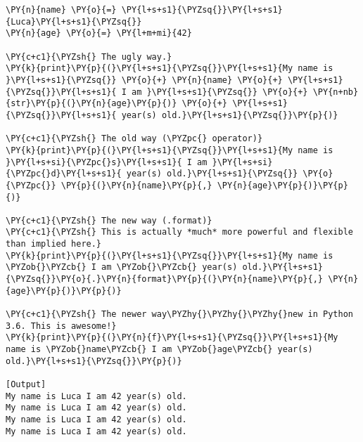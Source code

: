 \begin{Verbatim}[label=\makebox{\url{https://bitbucket.org/lbaldini/programming/src/tip/snippets/string\_formatting.py}},commandchars=\\\{\}]
\PY{n}{name} \PY{o}{=} \PY{l+s+s1}{\PYZsq{}}\PY{l+s+s1}{Luca}\PY{l+s+s1}{\PYZsq{}}
\PY{n}{age} \PY{o}{=} \PY{l+m+mi}{42}

\PY{c+c1}{\PYZsh{} The ugly way.}
\PY{k}{print}\PY{p}{(}\PY{l+s+s1}{\PYZsq{}}\PY{l+s+s1}{My name is }\PY{l+s+s1}{\PYZsq{}} \PY{o}{+} \PY{n}{name} \PY{o}{+} \PY{l+s+s1}{\PYZsq{}}\PY{l+s+s1}{ I am }\PY{l+s+s1}{\PYZsq{}} \PY{o}{+} \PY{n+nb}{str}\PY{p}{(}\PY{n}{age}\PY{p}{)} \PY{o}{+} \PY{l+s+s1}{\PYZsq{}}\PY{l+s+s1}{ year(s) old.}\PY{l+s+s1}{\PYZsq{}}\PY{p}{)}

\PY{c+c1}{\PYZsh{} The old way (\PYZpc{} operator)}
\PY{k}{print}\PY{p}{(}\PY{l+s+s1}{\PYZsq{}}\PY{l+s+s1}{My name is }\PY{l+s+si}{\PYZpc{}s}\PY{l+s+s1}{ I am }\PY{l+s+si}{\PYZpc{}d}\PY{l+s+s1}{ year(s) old.}\PY{l+s+s1}{\PYZsq{}} \PY{o}{\PYZpc{}} \PY{p}{(}\PY{n}{name}\PY{p}{,} \PY{n}{age}\PY{p}{)}\PY{p}{)}

\PY{c+c1}{\PYZsh{} The new way (.format)}
\PY{c+c1}{\PYZsh{} This is actually *much* more powerful and flexible than implied here.}
\PY{k}{print}\PY{p}{(}\PY{l+s+s1}{\PYZsq{}}\PY{l+s+s1}{My name is \PYZob{}\PYZcb{} I am \PYZob{}\PYZcb{} year(s) old.}\PY{l+s+s1}{\PYZsq{}}\PY{o}{.}\PY{n}{format}\PY{p}{(}\PY{n}{name}\PY{p}{,} \PY{n}{age}\PY{p}{)}\PY{p}{)}

\PY{c+c1}{\PYZsh{} The newer way\PYZhy{}\PYZhy{}\PYZhy{}new in Python 3.6. This is awesome!}
\PY{k}{print}\PY{p}{(}\PY{n}{f}\PY{l+s+s1}{\PYZsq{}}\PY{l+s+s1}{My name is \PYZob{}name\PYZcb{} I am \PYZob{}age\PYZcb{} year(s) old.}\PY{l+s+s1}{\PYZsq{}}\PY{p}{)}

[Output]
My name is Luca I am 42 year(s) old.
My name is Luca I am 42 year(s) old.
My name is Luca I am 42 year(s) old.
My name is Luca I am 42 year(s) old.
\end{Verbatim}